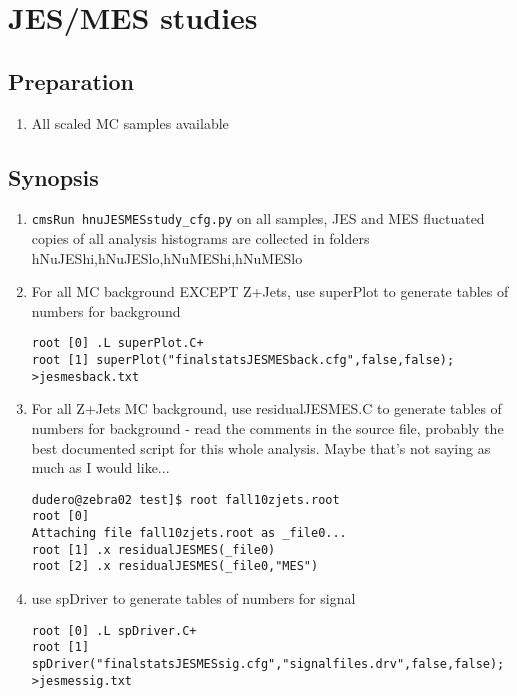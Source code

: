 \documentclass[english]{article}
\begin{document}
\section{JES/MES studies}

\subsection{Preparation}
%
\begin{enumerate}
\item All scaled MC samples available
\end{enumerate}

\subsection{Synopsis}
%
\begin{enumerate}
%
\item \verb#cmsRun hnuJESMESstudy_cfg.py# on all samples,
JES and MES fluctuated copies of all analysis histograms are
collected in folders hNuJEShi,hNuJESlo,hNuMEShi,hNuMESlo
%
\item For all MC background EXCEPT Z+Jets, use superPlot to generate
tables of numbers for background
%
\begin{lstlisting}
root [0] .L superPlot.C+
root [1] superPlot("finalstatsJESMESback.cfg",false,false); >jesmesback.txt
\end{lstlisting}
%
\item For all Z+Jets MC background, use residualJESMES.C to generate
tables of numbers for background - read the comments in the source
file, probably the best documented script for this whole analysis.
Maybe that's not saying as much as I would like...
%
\begin{lstlisting}
dudero@zebra02 test]$ root fall10zjets.root
root [0] 
Attaching file fall10zjets.root as _file0...
root [1] .x residualJESMES(_file0)
root [2] .x residualJESMES(_file0,"MES")
\end{lstlisting}
%
\item use spDriver to generate tables of numbers for signal
%
\begin{lstlisting}
root [0] .L spDriver.C+
root [1] spDriver("finalstatsJESMESsig.cfg","signalfiles.drv",false,false); >jesmessig.txt
\end{lstlisting}
%
\end{enumerate}
\end{document}
